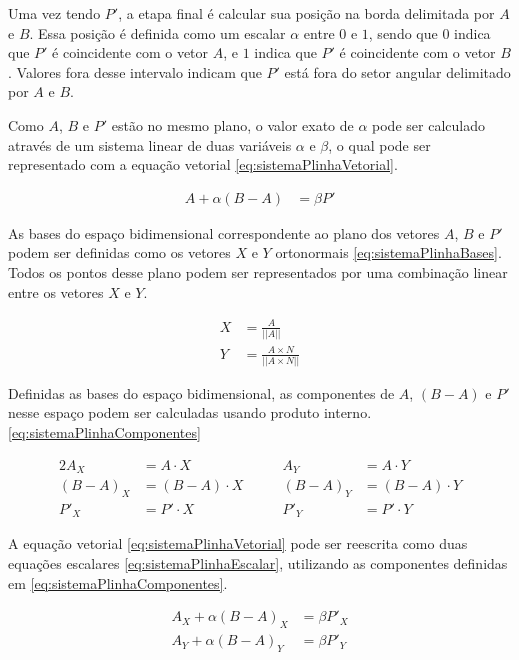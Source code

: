 \documentclass[brazil,pagestart=firstchapter]{abnt}
\begin{document}
Uma vez tendo $P'$, a etapa final é calcular sua posição na borda delimitada
por $A$ e $B$. Essa posição é definida como um escalar $\alpha$ entre $0$ e
$1$, sendo que $0$ indica que $P'$ é coincidente com o vetor $A$, e $1$
indica que $P'$ é coincidente com o vetor $B$. Valores fora desse intervalo
indicam que $P'$ está fora do setor angular delimitado por $A$ e $B$.

Como $A$, $B$ e $P'$ estão no mesmo plano, o valor exato de $\alpha$ pode
ser calculado através de um sistema linear de duas variáveis $\alpha$ e
$\beta$, o qual pode ser representado com a equação vetorial
\eqref{eq:sistemaPlinhaVetorial}.

\begin{align}
\label{eq:sistemaPlinhaVetorial}
A   + \alpha (B-A)   & = \beta P'
\end{align}

As bases do espaço bidimensional correspondente ao plano dos vetores $A$,
$B$ e $P'$ podem ser definidas como os vetores $X$ e $Y$ ortonormais
\eqref{eq:sistemaPlinhaBases}. Todos os pontos desse plano podem ser
representados por uma combinação linear entre os vetores $X$ e $Y$.

\begin{align}
\label{eq:sistemaPlinhaBases}
X & = \frac{A}{ || A || }                     \\
Y & = \frac{A \times N}{ || A \times N || }   \nonumber
\end{align}

Definidas as bases do espaço bidimensional, as componentes de $A$, $(B-A)$ e
$P'$ nesse espaço podem ser calculadas usando produto interno.
\eqref{eq:sistemaPlinhaComponentes}

\begin{alignat}{2}
\label{eq:sistemaPlinhaComponentes}
A_X     & = A \cdot X     & \qquad A_Y     & = A \cdot Y      \\
(B-A)_X & = (B-A) \cdot X & \qquad (B-A)_Y & = (B-A) \cdot Y  \nonumber \\
P'_X    & = P' \cdot X    & \qquad P'_Y    & = P' \cdot Y     \nonumber
\end{alignat}

A equação vetorial \eqref{eq:sistemaPlinhaVetorial} pode ser reescrita
como duas equações escalares \eqref{eq:sistemaPlinhaEscalar}, utilizando as
componentes definidas em \eqref{eq:sistemaPlinhaComponentes}.

\begin{align}
\label{eq:sistemaPlinhaEscalar}
A_X + \alpha (B-A)_X & = \beta P'_X  \\
A_Y + \alpha (B-A)_Y & = \beta P'_Y  \nonumber
\end{align}
\end{document}
